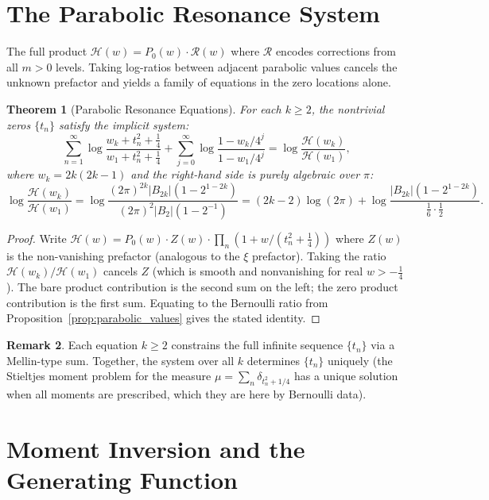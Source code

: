 \documentclass[%
 aip,
 amsmath,amssymb,
 reprint,%
]{revtex4-1}
\theoremstyle{plain}
\newtheorem{theorem}{Theorem}[section]
\theoremstyle{definition}
\newtheorem{remark}[theorem]{Remark}
\begin{document}
\section{The Parabolic Resonance System}

The full product $\mathcal{H}(w) = P_0(w)\cdot\mathcal{R}(w)$ where
$\mathcal{R}$ encodes corrections from all $m>0$ levels.  Taking log-ratios
between adjacent parabolic values cancels the unknown prefactor and yields a
family of equations in the zero locations alone.

\begin{theorem}[Parabolic Resonance Equations]\label{thm:resonance}
For each $k\ge 2$, the nontrivial zeros $\{t_n\}$ satisfy the implicit system:
\[
\sum_{n=1}^\infty \log\frac{w_k + t_n^2+\tfrac{1}{4}}{w_1 + t_n^2+\tfrac{1}{4}}
+ \sum_{j=0}^\infty\log\frac{1-w_k/4^j}{1-w_1/4^j}
= \log\frac{\mathcal{H}(w_k)}{\mathcal{H}(w_1)},
\]
where $w_k = 2k(2k-1)$ and the right-hand side is purely algebraic over $\pi$:
\[
\log\frac{\mathcal{H}(w_k)}{\mathcal{H}(w_1)}
= \log\frac{(2\pi)^{2k}|B_{2k}|(1-2^{1-2k})}{(2\pi)^2|B_2|(1-2^{-1})}
= (2k-2)\log(2\pi) + \log\frac{|B_{2k}|(1-2^{1-2k})}{\tfrac{1}{6}\cdot\tfrac{1}{2}}.
\]
\end{theorem}

\begin{proof}
Write $\mathcal{H}(w) = P_0(w)\cdot Z(w)\cdot\prod_n(1+w/(t_n^2+\tfrac14))$
where $Z(w)$ is the non-vanishing prefactor (analogous to the $\xi$ prefactor).
Taking the ratio $\mathcal{H}(w_k)/\mathcal{H}(w_1)$ cancels $Z$ (which is
smooth and nonvanishing for real $w>-\tfrac14$).  The bare product contribution
is the second sum on the left; the zero product contribution is the first sum.
Equating to the Bernoulli ratio from Proposition~\ref{prop:parabolic_values}
gives the stated identity.
\end{proof}

\begin{remark}
Each equation $k\ge 2$ constrains the full infinite sequence $\{t_n\}$ via a
Mellin-type sum.  Together, the system over all $k$ determines $\{t_n\}$
uniquely (the Stieltjes moment problem for the measure $\mu = \sum_n
\delta_{t_n^2+1/4}$ has a unique solution when all moments are prescribed, which
they are here by Bernoulli data).
\end{remark}

\section{Moment Inversion and the Generating Function}
\end{document}
